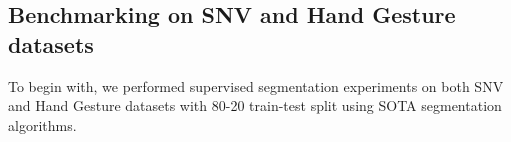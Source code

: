 \documentclass[runningheads]{llncs}
\begin{document}
\subsection{Benchmarking on SNV and Hand Gesture datasets}
To begin with, we performed supervised segmentation experiments on both SNV and Hand Gesture datasets with 80-20 train-test split using SOTA segmentation algorithms.
\bgroup
\setlength{\tabcolsep}{18pt}
\begin{table}[h]
\caption{Benchmarking Skin NIR Vision (SNV) dataset and Hand Gesture dataset on standard segmentation architectures with 80-20 train-test split.}
\begin{center}
\end{center}
\label{Table:Datasetbench}
\end{table}
\egroup
\end{document}
